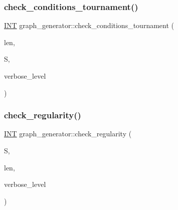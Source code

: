 \mbox{\label{classgraph__generator_ab2d3a1fcd6641f5e9243b20cda46a65f}} 
\subsubsection{\texorpdfstring{check\+\_\+conditions\+\_\+tournament()}{check\_conditions\_tournament()}}
{\footnotesize\ttfamily \mbox{\hyperlink{galois_8h_a09fddde158a3a20bd2dcadb609de11dc}{I\+NT}} graph\+\_\+generator\+::check\+\_\+conditions\+\_\+tournament (\begin{DoxyParamCaption}\item[{\mbox{\hyperlink{galois_8h_a09fddde158a3a20bd2dcadb609de11dc}{I\+NT}}}]{len,  }\item[{\mbox{\hyperlink{galois_8h_a09fddde158a3a20bd2dcadb609de11dc}{I\+NT}} $\ast$}]{S,  }\item[{\mbox{\hyperlink{galois_8h_a09fddde158a3a20bd2dcadb609de11dc}{I\+NT}}}]{verbose\+\_\+level }\end{DoxyParamCaption})}

\mbox{\label{classgraph__generator_a8606511db2ddfc8c067160cf4e89afab}} 
\subsubsection{\texorpdfstring{check\+\_\+regularity()}{check\_regularity()}}
{\footnotesize\ttfamily \mbox{\hyperlink{galois_8h_a09fddde158a3a20bd2dcadb609de11dc}{I\+NT}} graph\+\_\+generator\+::check\+\_\+regularity (\begin{DoxyParamCaption}\item[{\mbox{\hyperlink{galois_8h_a09fddde158a3a20bd2dcadb609de11dc}{I\+NT}} $\ast$}]{S,  }\item[{\mbox{\hyperlink{galois_8h_a09fddde158a3a20bd2dcadb609de11dc}{I\+NT}}}]{len,  }\item[{\mbox{\hyperlink{galois_8h_a09fddde158a3a20bd2dcadb609de11dc}{I\+NT}}}]{verbose\+\_\+level }\end{DoxyParamCaption})}

